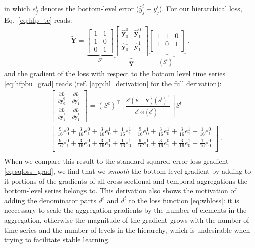 \documentclass[preprint, 3p, times, twocolumn]{elsarticle}
\begin{document}
in which \(e^i_j\) denotes the bottom-level error (\(\hat{y}^i_j - \bar{y}^i_j\)).
For our hierarchical loss, Eq.~\eqref{eq:hfp_tc} reads:
\begin{align}
  \tilde{\textbf{Y}} = \underbrace{
    \begin{bmatrix}
    1 &1 \\
    1 &0 \\
    0 &1
    \end{bmatrix}}_{S^c}
    \underbrace{    
    \begin{bmatrix}
      \hat{\textbf{y}}^0_{0} & \hat{\textbf{y}}^0_{1} \\
      \hat{\textbf{y}}^1_{0} & \hat{\textbf{y}}^1_{1} \\
    \end{bmatrix}}_{\hat{\textbf{Y}}}
    \underbrace{
    \begin{bmatrix}
      1 &1 &0\\
      1 &0 &1\\
      \end{bmatrix}}_{(S^t)^\intercal}     
    \;,
\end{align}
and the gradient of the loss with respect to the bottom level time series \eqref{eq:hfpbu_grad} reads (ref. \ref{app:hl_derivation} for the full derivation):
\begin{align*} 
  &\begin{bmatrix}
  \frac{\partial L}{\partial \hat{\textbf{y}}^0_{0}} & \frac{\partial L}{\partial \hat{\textbf{y}}^0_{1}} \\
  \frac{\partial L}{\partial \hat{\textbf{y}}^1_{1}} & \frac{\partial L}{\partial \hat{\textbf{y}}^1_{1}}
  \end{bmatrix} 
  = (S^c)^\intercal \left[ \frac{S^c \left(\hat{\textbf{Y}} - \bar{\textbf{Y}}\right) (S^t)^\intercal}{ d^c \otimes (d^t)^\intercal } \right] S^t \\
  = 
  &\begin{bmatrix}
    \frac{9}{16}e_0^0 + \frac{3}{16}e_1^0 + \frac{3}{16}e_0^1 + \frac{1}{16}e_1^1 & \frac{9}{16}e_0^1 + \frac{3}{16}e_0^1 + \frac{3}{16}e_1^1 + \frac{1}{16}e_1^0 \\
    \frac{9}{16}e_1^0 + \frac{3}{16}e_0^0 + \frac{3}{16}e_1^1 + \frac{1}{16}e_0^1 & \frac{9}{16}e_1^1 + \frac{3}{16}e_1^0 + \frac{3}{16}e_0^1 + \frac{1}{16}e_0^0 \\
  \end{bmatrix}  \;. \nonumber \\         
\end{align*}
When we compare this result to the standard squared error loss gradient \eqref{eq:sqloss_grad}, we find that we \textit{smooth} the bottom-level gradient by adding to it portions of the gradients of all cross-sectional and temporal aggregations the bottom-level series belongs to. This derivation also shows the motivation of adding the denominator parts \(d^c\) and \(d^t\) to the loss function \eqref{eq:whloss}: it is neccessary to scale the aggregation gradients by the number of elements in the aggregation, otherwise the magnitude of the gradient grows with the number of time series and the number of levels in the hierarchy, which is undesirable when trying to facilitate stable learning.
  
\end{document}
